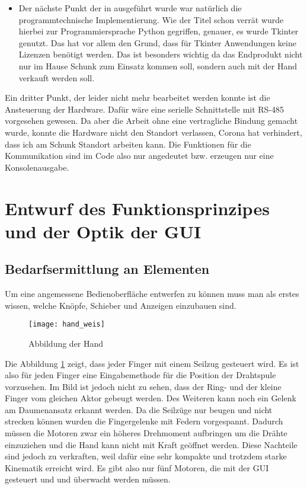 \documentclass[11pt]{scrartcl}
\begin{document}
\begin{onehalfspace}
\begin{itemize}
\item  Der nächste Punkt der in ausgeführt wurde war natürlich die programmtechnische Implementierung. Wie der Titel schon verrät wurde hierbei zur Programmiersprache Python gegriffen, genauer, es wurde Tkinter genutzt.
Das hat vor allem den Grund, dass für Tkinter Anwendungen keine Lizenzen benötigt werden. Das ist besonders wichtig da das Endprodukt nicht nur im Hause Schunk zum Einsatz kommen soll, sondern auch mit der Hand verkauft werden soll.
\end{itemize}

Ein dritter Punkt, der leider nicht mehr bearbeitet werden konnte ist die Ansteuerung der Hardware. Dafür wäre eine serielle Schnittstelle mit RS-485 vorgesehen gewesen. Da aber die Arbeit ohne eine vertragliche Bindung gemacht wurde, konnte die Hardware nicht den Standort verlassen, Corona hat verhindert, dass ich am Schunk Standort arbeiten kann. Die Funktionen für die Kommunikation
sind im Code also nur angedeutet bzw. erzeugen nur eine Konsolenausgabe. 
\newpage

\section{Entwurf des Funktionsprinzipes und der Optik der GUI}


\subsection{Bedarfsermittlung an Elementen}
Um eine angemessene Bedienoberfläche entwerfen zu können muss man als erstes wissen, welche Knöpfe, Schieber und Anzeigen einzubauen sind.

\begin{figure}[h]
\texttt{[image: hand\_weis]}
\caption{Abbildung der Hand}
\label{fig:hand_weis}
\end{figure}
\vspace{1cm}

Die Abbildung \ref{fig:hand_weis} zeigt, dass jeder Finger mit einem Seilzug gesteuert wird. Es ist also für jeden Finger eine Eingabemethode für die Position
 der Drahtspule vorzusehen. Im Bild ist jedoch nicht zu sehen, dass der Ring- und der kleine Finger vom gleichen Aktor gebeugt werden. Des Weiteren kann noch ein Gelenk am Daumenansatz erkannt werden. Da die Seilzüge nur beugen und nicht strecken können wurden die Fingergelenke mit Federn vorgespannt. Dadurch müssen die Motoren zwar ein höheres Drehmoment aufbringen um die Drähte einzuziehen und die Hand kann nicht mit Kraft geöffnet werden. Diese Nachteile sind jedoch zu verkraften, weil dafür eine sehr kompakte und trotzdem starke Kinematik erreicht wird. Es gibt also nur fünf Motoren, die mit der GUI gesteuert und und überwacht werden müssen.\\\\
 

\end{onehalfspace}
\end{document}
